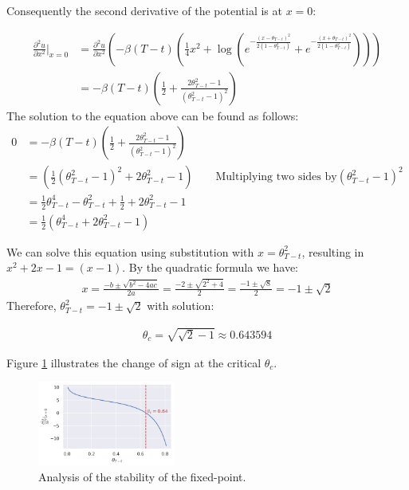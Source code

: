 Consequently the second derivative of the potential is at $x=0$:

\begin{align}
    \frac{\partial^2 u}{\partial x^2}\bigg|_{x=0} &=  \frac{\partial^2 u}{\partial x^2}\left(- \beta(T- t) \left( \frac{1}{4} x^2 +  \log{\left(e^{-\frac{(x - \theta_{T-t})^2}{2 (1 - \theta_{T-t}^2)}} + e^{-\frac{(x + \theta_{T-t})^2}{2 (1 - \theta_{T-t}^2)}} \right)} \right)\right) \nonumber\\
    &=- \beta(T -t) \left( \frac{1}{2} + \frac{2 \theta_{T-t}^2 - 1}{(\theta_{T-t}^2 - 1)^2} \right)
\end{align}
The solution to the equation above can be found as follows:
\begin{align}
      0 &= - \beta(T -t) \left( \frac{1}{2} + \frac{2 \theta_{T-t}^2 - 1}{(\theta_{T-t}^2 - 1)^2} \right) \nonumber\\
      &= \left( \frac{1}{2}(\theta_{T-t}^2 - 1)^2 +  2 \theta_{T-t}^2 - 1 \right) \quad\quad \text{Multiplying two sides by} (\theta_{T-t}^2 - 1)^2 \nonumber\\
      &= \frac{1}{2}\theta_{T-t}^4 - \theta_{T-t}^2 + \frac{1}{2}+  2 \theta_{T-t}^2 - 1  \nonumber\\
      &= \frac{1}{2}\left(\theta_{T-t}^4 + 2\theta_{T-t}^2 - 1 \right)
\end{align}

We can solve this equation using substitution with $x=\theta_{T-t}^2$, resulting in $x^2 + 2x -1 = (x-1) $. By the quadratic formula we have:
\begin{align}
    x = \frac{-b \pm \sqrt{b^2 - 4ac}}{2a} = \frac{-2 \pm \sqrt{2^2 + 4}}{2} =  \frac{-1 \pm \sqrt{8}}{2} =-1 \pm \sqrt{2}
\end{align}
Therefore, $\theta_{T-t}^2 =  -1 \pm \sqrt{2}$ with solution:

\begin{align*}
     \theta_{c} = \sqrt{\sqrt{2}-1} \approx 0.643594
\end{align*}

Figure \ref{fig:critical_point} illustrates the change of sign at the critical $\theta_c$.


\begin{figure}
     \centering
    \includegraphics[width=0.4\textwidth]{figs/plots/critical_point_theta.png}
    \caption{Analysis of the stability of the fixed-point.}
    \label{fig:critical_point}
\end{figure}

